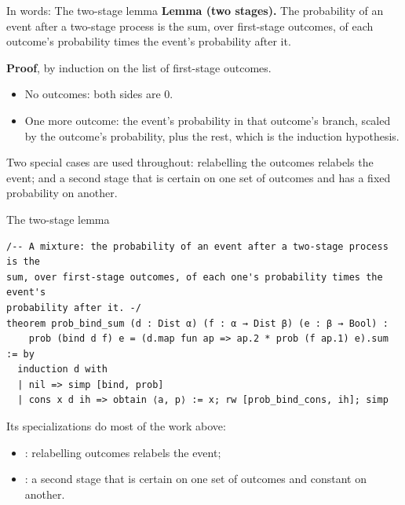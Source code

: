 \documentclass[aspectratio=169,11pt]{beamer}
\begin{document}
\begin{frame}{In words: The two-stage lemma}
  \textbf{Lemma (two stages).} The probability of an event after a two-stage process is the sum, over first-stage outcomes, of each outcome's probability times the event's probability after it.
  \bigskip

  \textbf{Proof}, by induction on the list of first-stage outcomes.
  \begin{itemize}
    \item No outcomes: both sides are 0.
    \item One more outcome: the event's probability in that outcome's branch, scaled by the outcome's probability, plus the rest, which is the induction hypothesis.
  \end{itemize}
  \bigskip
  Two special cases are used throughout: relabelling the outcomes relabels the event; and a second stage that is certain on one set of outcomes and has a fixed probability on another.
\end{frame}


\begin{frame}[fragile]{The two-stage lemma}
\begin{Verbatim}
/-- A mixture: the probability of an event after a two-stage process is the
sum, over first-stage outcomes, of each one's probability times the event's
probability after it. -/
theorem prob_bind_sum (d : Dist α) (f : α → Dist β) (e : β → Bool) :
    prob (bind d f) e = (d.map fun ap => ap.2 * prob (f ap.1) e).sum := by
  induction d with
  | nil => simp [bind, prob]
  | cons x d ih => obtain ⟨a, p⟩ := x; rw [prob_bind_cons, ih]; simp
\end{Verbatim}
  \medskip
  Its specializations do most of the work above:
  \begin{itemize}\small
    \item {}: relabelling outcomes relabels the event;
    \item {}: a second stage that is certain on one set of outcomes and constant on another.
  \end{itemize}
\end{frame}
\end{document}
